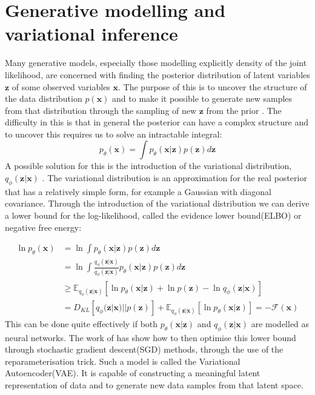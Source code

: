 \documentclass{report}
\newcommand{\E}{\mathbb{E}}
\newcommand{\bx}{\mathbf{x}}
\newcommand{\bz}{\mathbf{z}}
\begin{document}

\section{Generative modelling and variational inference}
Many generative models, especially those modelling explicitly density of the joint likelihood, are concerned with finding the posterior distribution of latent variables $\bz$ of some observed variables $\bx$. The purpose of this is to uncover the structure of the data distribution $p(\bx)$ and to make it possible to generate new samples from that distribution through the sampling of new $\bz$ from the prior \parencite{bishop2006pattern}. The difficulty in this is that in general the posterior can have a complex structure and to uncover this requires us to solve an intractable integral:
\begin{equation}
    p_\theta(\bx) = \int p_\theta(\bx|\bz)p(\bz) d\bz
\end{equation}
A possible solution for this is the introduction of the variational distribution, $q_\phi(\bz|\bx)$ \parencite{bishop2006pattern}. The variational distribution is an approximation for the real posterior that has a relatively simple form, for example a Gaussian with diagonal covariance. Through the introduction of the variational distribution we can derive a lower bound for the log-likelihood, called the evidence lower bound(ELBO) or negative free energy:

\begin{equation}\label{equation:negative_free_energy}
    \begin{split}
    \ln p_\theta(\bx) &= \ln \int p_\theta(\bx|\bz)p(\bz) d\bz\\
    &= \ln \int \frac{q_\phi(\bz|\bx)}{q_\phi(\bz|\bx)} p_\theta(\bx|\bz)p(\bz)d\bz\\
    &\geq \E_{q_\phi(\bz|\bx)}[\ln p_\theta(\bx|\bz) + \ln p(\bz) - \ln q_\phi(\bz|\bx)] \\
    &= D_{KL}[q_\phi(\bz|\bx) || p(\bz)] + \E_{q_\phi(\bz|\bx)}[\ln p_\theta(\bx|\bz)]= -\mathcal{F}(\bx)
    \end{split}
\end{equation}
This can be done quite effectively if both $p_\theta(\bx|\bz)$ and $q_\phi(\bz|\bx)$ are modelled as neural networks. The work of \textcite{kingma2013auto} has show how to then optimise this lower bound through stochastic gradient descent(SGD) methods, through the use of the reparameterisation trick. Such a model is called the Variational Autoencoder(VAE). It is capable of constructing a meaningful latent representation of data and to generate new data samples from that latent space. 
\end{document}
